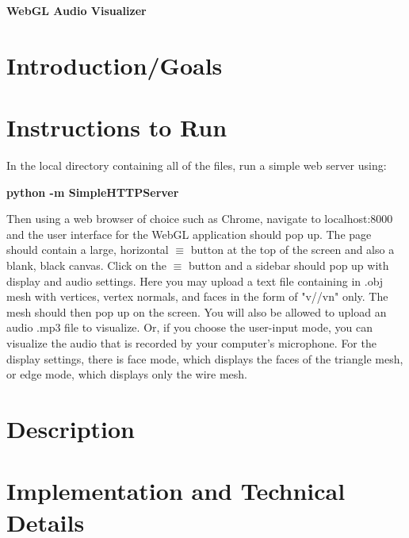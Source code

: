 \documentclass[12pt]{article}
\begin{document}
\setlength{\parindent}{0in}
\addtolength{\parskip}{0.1cm}
\setlength{\fboxrule}{.5mm}\setlength{\fboxsep}{1.2mm}
\newlength{\boxlength}\setlength{\boxlength}{\textwidth}
\addtolength{\boxlength}{-4mm}
\begin{center}
\end{center}


{\LARGE \bf WebGL Audio Visualizer}


\section{Introduction/Goals}

\section{Instructions to Run}
In the local directory containing all of the files, run a simple web server using:
\begin{center}
	\textbf{python -m SimpleHTTPServer}
\end{center}
Then using a web browser of choice such as Chrome, navigate to localhost:8000 and the user interface for the WebGL application should pop up. The page should contain a large, horizontal $\equiv$ button at the top of the screen and also a blank, black canvas. Click on the $\equiv$ button and a sidebar should pop up with display and audio settings. Here you may upload a text file containing in .obj mesh with vertices, vertex normals, and faces in the form of "v//vn" only. The mesh should then pop up on the screen. You will also be allowed to upload an audio .mp3 file to visualize. Or, if you choose the user-input mode, you can visualize the audio that is recorded by your computer's microphone. For the display settings, there is face mode, which displays the faces of the triangle mesh, or edge mode, which displays only the wire mesh.

\section{Description}

\section{Implementation and Technical Details}
\end{document}
